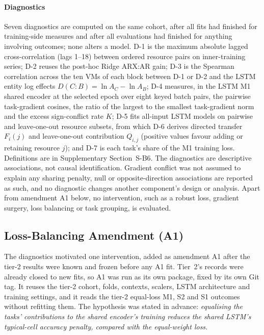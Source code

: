 \documentclass[5p,twocolumn]{elsarticle}
\begin{document}
\paragraph{Diagnostics} Seven diagnostics are computed on the same cohort,
after all fits had finished for training-side measures and after all
evaluations had finished for anything involving outcomes; none alters a model.
D-1 is the maximum absolute lagged cross-correlation (lags 1--18) between
ordered resource pairs on inner-training series; D-2 reuses the post-hoc Ridge
ARX:AR gain; D-3 is the Spearman correlation across the ten VMs of each block
between D-1 or D-2 and the LSTM entity log effects
$D(C\!:\!B)=\ln A_C-\ln A_B$; D-4 measures, in the LSTM M1 shared encoder at
the selected epoch over eight keyed batch pairs, the pairwise task-gradient
cosines, the ratio of the largest to the smallest task-gradient norm and the
excess sign-conflict rate $K$; D-5 fits all-input LSTM models on pairwise and
leave-one-out resource subsets, from which D-6 derives directed transfer
$F_i(j)$ and leave-one-out contribution $Q_{i,j}$ (positive values favour
adding or retaining resource $j$); and D-7 is each task's share of the M1
training loss. Definitions are in Supplementary Section~S-B6.
The diagnostics are descriptive associations, not causal identification.
Gradient conflict was not assumed to explain any sharing penalty, null or
opposite-direction associations are reported as such, and no diagnostic
changes another component's design or analysis. Apart from amendment A1
below, no intervention, such as a robust loss, gradient surgery, loss
balancing or task grouping, is evaluated.

\subsection{Loss-Balancing Amendment (A1)}
\label{sec:a1-design}

The diagnostics motivated one intervention, added as amendment A1 after the
tier-2 results were known and frozen before any A1 fit. Tier~2's records were
already closed to new fits, so A1 was run as its own package, fixed by its own
Git tag. It reuses the tier-2
cohort, folds, contexts, scalers, LSTM architecture and training settings,
and it reads the tier-2 equal-loss M1, S2 and S1 outcomes without refitting
them. The hypothesis was stated in advance: \emph{equalising the tasks'
contributions to the shared encoder's training reduces the shared LSTM's
typical-cell accuracy penalty, compared with the equal-weight loss.}
\end{document}
